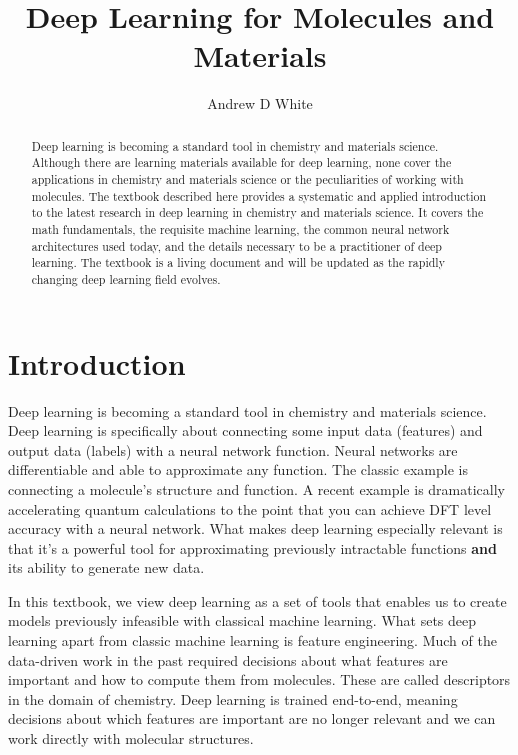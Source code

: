 \documentclass[9pt,pubversion,training]{livecoms}
\title{Deep Learning for Molecules and Materials}
\author[1]{Andrew D White}
\affil[1]{Department of Chemical Engineering, University of Rochester, Rochester, NY}
\begin{document}
\begin{frontmatter}
\maketitle

\begin{abstract}
Deep learning is becoming a standard tool in chemistry and materials science. Although there are learning materials available for deep learning, none cover the applications in chemistry and materials science or the peculiarities of working with molecules. The textbook described here provides a systematic and applied introduction to the latest research in deep learning in chemistry and materials science. It covers the math fundamentals, the requisite machine learning, the common neural network architectures used today, and the details necessary to be a practitioner of deep learning. The textbook is a living document and will be updated as the rapidly changing deep learning field evolves.
\end{abstract}

\end{frontmatter}

\section{Introduction}

Deep learning is becoming a standard tool in chemistry and materials science. Deep learning is specifically about connecting some input data (features) and output data (labels) with a neural network function. Neural networks are differentiable and able to approximate any function. The classic example is connecting a molecule's structure and function. A recent example is dramatically accelerating quantum calculations to the point that you can achieve DFT level accuracy with a neural network\cite{smith2017ani}. What makes deep learning especially relevant is that it's a powerful tool for approximating previously intractable functions \textbf{and} its ability to generate new data.

In this textbook, we view deep learning as a set of tools that enables us to create models previously infeasible with classical machine learning. What sets deep learning apart from classic machine learning is feature engineering. Much of the data-driven work in the past required decisions about what features are important and how to compute them from molecules. These are called descriptors in the domain of chemistry. Deep learning is trained end-to-end, meaning decisions about which features are important are no longer relevant and we can work directly with molecular structures.
\end{document}
